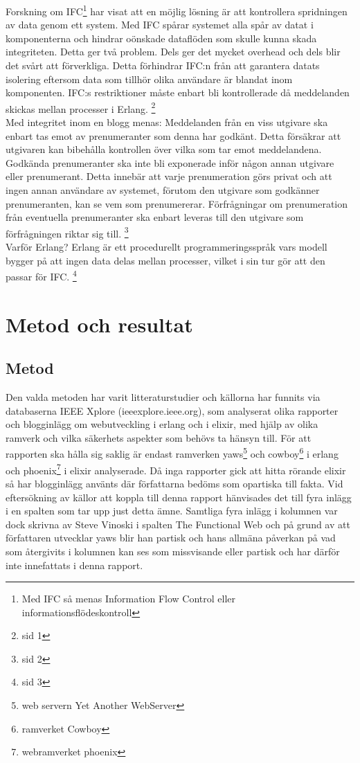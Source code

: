 \documentclass[12pt]{article}
\begin{document}

Forskning om IFC\footnote{Med IFC så menas Information Flow Control eller informationsflödeskontroll} har visat att en möjlig lösning är att kontrollera spridningen av data genom ett system.
Med IFC spårar systemet alla spår av datat i komponenterna och hindrar oönskade dataflöden som skulle kunna skada integriteten.
Detta ger två problem.
Dels ger det mycket overhead och dels blir det svårt att förverkliga.
Detta förhindrar IFC:n från att garantera datats isolering eftersom data som tillhör olika användare är blandat inom komponenten.
IFC:s restriktioner måste enbart bli kontrollerade då meddelanden skickas mellan processer i Erlang.
 \footnote{sid 1\cite{IFC}}
\\
Med integritet inom en blogg menas:
Meddelanden från en viss utgivare ska enbart tas emot av prenumeranter som denna har godkänt.
Detta försäkrar att utgivaren kan bibehålla kontrollen över vilka som tar emot meddelandena.
Godkända prenumeranter ska inte bli exponerade inför någon annan utgivare eller prenumerant.
Detta innebär att varje prenumeration görs privat och att ingen annan användare av systemet, förutom den utgivare som godkänner prenumeranten, kan se vem som prenumererar.
Förfrågningar om prenumeration från eventuella prenumeranter ska enbart leveras till den utgivare som förfrågningen riktar sig till.
\footnote{sid 2\cite{IFC}}
\\
Varför Erlang? Erlang är ett procedurellt programmeringsspråk vars modell bygger på att ingen data delas mellan processer, vilket i sin tur gör att den passar för IFC.
\footnote{ sid 3\cite{IFC}}

\section{Metod och 	resultat }	

\subsection{ Metod}
Den valda metoden har varit litteraturstudier och källorna har funnits via databaserna IEEE Xplore  (ieeexplore.ieee.org),  som analyserat olika rapporter och blogginlägg om webutveckling i erlang och i elixir, med hjälp av olika ramverk och vilka säkerhets aspekter som behövs ta hänsyn till.
För att rapporten ska hålla sig saklig är endast ramverken yaws\footnote{web servern Yet Another WebServer\cite{yawsorg}} och cowboy\footnote{ramverket Cowboy\cite{cowboyorg}} i erlang och phoenix\footnote{webramverket phoenix\cite{phoenixorg}} i elixir analyserade.
Då inga rapporter gick att hitta rörande elixir så har blogginlägg använts där författarna bedöms som opartiska till fakta.
Vid eftersökning av källor att koppla till denna rapport hänvisades det till fyra inlägg i en spalten som tar upp just detta ämne.
Samtliga fyra inlägg i kolumnen var dock skrivna av Steve Vinoski i spalten The Functional Web och på grund av att författaren utvecklar yaws blir han partisk och hans allmäna påverkan på vad som återgivits i kolumnen kan ses som missvisande eller partisk och har därför inte innefattats i denna rapport.
\end{document}
